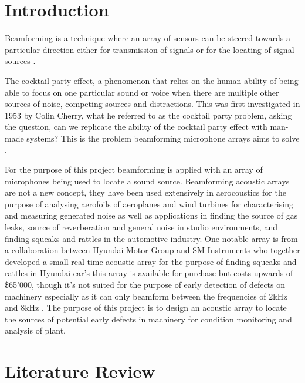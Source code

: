\documentclass{UoNMCHA}
\numberwithin{equation}{section}
\begin{document}
\section{Introduction} \label{sec:Introduction}
    
    Beamforming is a technique where an array of sensors can be steered towards a particular direction either for transmission of signals or for the locating of signal sources \citep{Sha18}.
    
    The cocktail party effect, a phenomenon that relies on the human ability of being able to focus on one particular sound or voice when there are multiple other sources of noise, competing sources and distractions. This was first investigated in 1953 by Colin Cherry, what he referred to as the cocktail party problem, asking the question, can we replicate the ability of the cocktail party effect with man-made systems? This is the problem beamforming microphone arrays aims to solve \citep{Ben08}.
    
    For the purpose of this project beamforming is applied with an array of microphones being used to locate a sound source. Beamforming acoustic arrays are not a new concept, they have been used extensively in aerocoustics for the purpose of analysing aerofoils of aeroplanes and wind turbines for characterising and measuring generated noise as well as applications in finding the source of gas leaks, source of reverberation and general noise in studio environments, and finding squeaks and rattles in the automotive industry. One notable array is from a collaboration between Hyundai Motor Group and SM Instruments who together developed a small real-time acoustic array for the purpose of finding squeaks and rattles in Hyundai car's this array is available for purchase but costs upwards of \$65'000, though it's not suited for the purpose of early detection of defects on machinery especially as it can only beamform between the frequencies of 2kHz and 8kHz \citep{Smi}. The purpose of this project is to design an acoustic array to locate the sources of potential early defects in machinery for condition monitoring and analysis of plant.
    
\newpage
\section{Literature Review} \label{sec:Literature Review}
\end{document}
